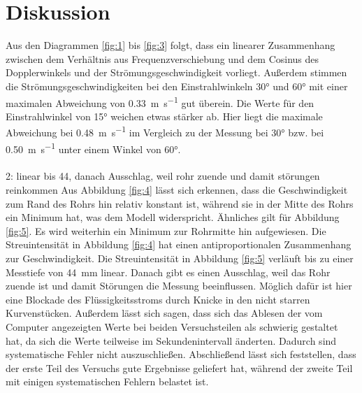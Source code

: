 \documentclass[
  bibliography=totoc,     %
  captions=tableheading,  %
  titlepage=firstiscover, %
]{scrartcl}
\begin{document}
\section{Diskussion}
Aus den Diagrammen \ref{fig:1} bis \ref{fig:3} folgt, dass ein linearer
Zusammenhang
zwischen dem Verhältnis aus Frequenzverschiebung und dem Cosinus des
Dopplerwinkels und
der Strömungsgeschwindigkeit vorliegt. Außerdem stimmen die
Strömungsgeschwindigkeiten bei
den Einstrahlwinkeln 30° und 60° mit einer maximalen Abweichung von
\SI{0.33}{\meter\per\second}
gut überein. Die Werte für den Einstrahlwinkel von 15° weichen etwas stärker
ab. Hier liegt die
maximale Abweichung bei \SI{0.48}{\meter\per\second} im Vergleich zu der
Messung bei 30°
bzw. bei \SI{0.50}{\meter\per\second} unter einem Winkel von 60°.\\
\\ 2: linear bis 44, danach Ausschlag, weil rohr zuende und damit störungen reinkommen
Aus Abbildung \ref{fig:4} lässt sich erkennen, dass die Geschwindigkeit zum
Rand des Rohrs hin relativ
konstant ist, während sie in der Mitte des Rohrs ein Minimum hat, was dem
Modell widerspricht.
Ähnliches gilt für Abbildung \ref{fig:5}. Es wird weiterhin ein Minimum zur Rohrmitte hin aufgewiesen.
Die Streuintensität in Abbildung \ref{fig:4} hat einen antiproportionalen Zusammenhang zur Geschwindigkeit. Die Streuintensität in Abbildung \ref{fig:5} verläuft bis zu einer Messtiefe von \SI{44}{\milli\meter} linear. Danach gibt es einen Ausschlag, weil das Rohr zuende ist und damit Störungen die Messung beeinflussen.
Möglich dafür ist hier eine Blockade des Flüssigkeitsstroms durch Knicke in den nicht
starren Kurvenstücken.
Außerdem lässt sich sagen, dass sich das Ablesen der vom Computer angezeigten
Werte bei beiden Versuchsteilen
als schwierig gestaltet hat, da sich die Werte teilweise im Sekundenintervall
änderten.
Dadurch sind systematische Fehler nicht auszuschließen. Abschließend lässt sich
feststellen,
dass der erste Teil des Versuchs gute Ergebnisse geliefert hat, während der
zweite Teil mit einigen systematischen Fehlern belastet ist.
\newpage
\nocite{*}
\printbibliography
\end{document}
